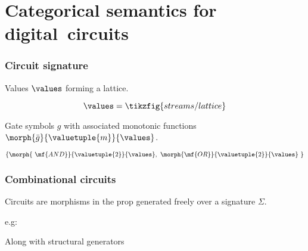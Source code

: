 \section{Categorical semantics for digital~circuits}

\begin{frame}
    \frametitle{Circuit signature}

    \pause

    \alert{Values} \(\values\) forming a lattice.

    \pause

    \[\values = \tikzfig{streams/lattice}\]

    \pause

    \alert{Gate symbols} \(g\) with associated monotonic functions \(\morph{\bar{g}}{\valuetuple{m}}{\values}\).

    \pause

    \[\{\morph{\ \mf{AND}}{\valuetuple{2}}{\values},\ \morph{\mf{OR}}{\valuetuple{2}}{\values}\ \}\]

\end{frame}

\begin{frame}
    \frametitle{Combinational circuits}

    \pause

    Circuits are \alert{morphisms} in the prop generated freely over a signature \(\Sigma\).

    \pause

    e.g:

    \begin{center}

        \pause

        \vspace{1em}

    \end{center}

    \vspace{1em}

    \pause

    Along with \alert{structural} generators 

    \begin{center}
        \quad
        \quad
    \end{center}

\end{frame}

